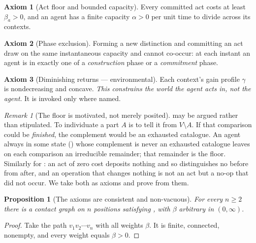\documentclass[11pt,a4paper]{article}
\theoremstyle{clstyle}
\newtheorem{proposition}[theorem]{Proposition}
\theoremstyle{definition}
\newtheorem{axiom}{Axiom}
\theoremstyle{remark}
\newtheorem{remark}[theorem]{Remark}
\newcommand{\V}{V}
\newcommand{\flo}{\beta}
\newcommand{\att}{\alpha}
\begin{document}
\begin{axiom}[Act floor and bounded capacity]
\label{ax:actfloor}
Every committed act costs at least $\flo_a>0$, and an agent has a finite
capacity $\att>0$ per unit time to divide across its contexts.
\end{axiom}

\begin{axiom}[Phase exclusion]
\label{ax:phase}
Forming a new distinction and committing an act draw on the same
instantaneous capacity and cannot co-occur: at each instant an agent is in
exactly one of a \emph{construction} phase or a \emph{commitment} phase.
\end{axiom}

\begin{axiom}[Diminishing returns --- environmental]
\label{ax:concave}
Each context's gain profile $\gamma$ is nondecreasing and concave.
\emph{This constrains the world the agent acts in, not the agent.} It is
invoked only where named.
\end{axiom}

\begin{remark}[The floor is motivated, not merely posited]
\label{rem:floor-motivated}
 may be argued rather than stipulated. To individuate a part
$A$ is to tell it from $\V\setminus A$. If that comparison could be
\emph{finished}, the complement would be an exhausted catalogue. An agent
always in some state () whose complement is never an
exhausted catalogue leaves on each comparison an irreducible remainder;
that remainder is the floor. Similarly for : an act of
zero cost deposits nothing and so distinguishes no before from after, and an
operation that changes nothing is not an act but a no-op that did not occur.
We take both as axioms and prove from them.
\end{remark}

\begin{proposition}[The axioms are consistent and non-vacuous]
\label{prop:consistency}
For every $n\ge2$ there is a contact graph on $n$ positions satisfying
, with $\flo$ arbitrary in $(0,\infty)$.
\end{proposition}

\begin{proof}
Take the path $v_1v_2\cdots v_n$ with all weights $\flo$. It is finite,
connected, nonempty, and every weight equals $\flo>0$.
\end{proof}
\end{document}
